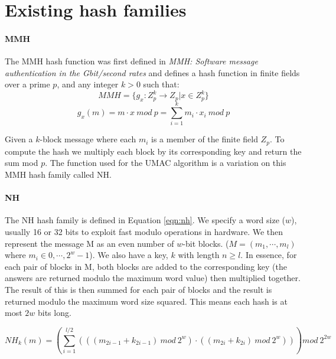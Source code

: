 \documentclass[10pt]{article} %
\begin{document}
\section{Existing hash families}

\paragraph{MMH}

The MMH hash function was first defined in \emph{MMH: Software message
authentication in the Gbit/second rates}\cite{mmh} and defines a hash function
in finite fields over a prime $p$, and any integer $k > 0$ such that:
\begin{equation}
MMH = \{g_x : Z^k_p \rightarrow Z_p | x \in Z^k_p\}
\end{equation}
\begin{equation} \label{eqn:mmh}
g_x(m) = m \cdot x\ mod\ p = \displaystyle\sum^k_{i=1} m_i \cdot x_i\ mod\ p
\end{equation}

Given a $k$-block message where each $m_i$ is a member of the finite field
$Z_p$. To compute the hash we multiply each block by its corresponding key and
return the sum mod $p$. The function used for the UMAC algorithm is a variation
on this MMH hash family called NH.

\paragraph{NH}

The NH hash family is defined in Equation \ref{eqn:nh}. We specify a word size ($w$), usually 16 or 32 bits to exploit fast
modulo operations in hardware. We then represent the message M as an even
number of $w$-bit blocks. ($M = (m_1,\cdots,m_l)$ where $m_i \in
{0,\cdots,2^w-1}$). We also have a key,
$k$ with length $n
\geq l$. In essence, for each pair of blocks in M, both blocks are added to
the corresponding key (the answers are returned modulo the maximum word value)
then multiplied together. The result of this is then summed for each pair of
blocks and the result is returned modulo the maximum word size squared. This
means each hash is at most $2w$ bits long. 

\begin{equation} \label{eqn:nh}
NH_k(m) = \left( \sum^{l/2}_{i=1} \left( \left( \left( m_{2i-1} + k_{2i-1}
\right)\ mod\ 2^w
\right) \cdot \left( \left( m_{2i} + k_{2i} \right)\ mod\ 2^w \right) \right)
\right) mod\ 2^{2w}
\end{equation}
\end{document}
